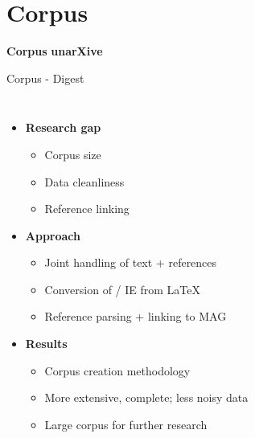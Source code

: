 \documentclass[en,16:9,smallfoot]{sdqbeamer}
\begin{document}
\section{Corpus}

   \begin{frame}[plain]
        \vspace{0.7cm}
        \begin{infobox-map}
        \centering
        \begin{Huge}
         {\textbf{Corpus}}
         {\textbf{\hphantom{C}unarXive\hphantom{C}}}
        \end{Huge}
        \end{infobox-map}
   \end{frame}

   \begin{frame}{Corpus - Digest}
   \begin{columns}
        \begin{itemize}
            \item \textbf{Research gap}
            \begin{itemize}
                \item Corpus size
                \item Data cleanliness
                \item Reference linking
            \end{itemize}
            \item \textbf{Approach}
            \begin{itemize}
                \item Joint handling of text + references
                \item Conversion of / IE from \LaTeX
                \item Reference parsing + linking to MAG
            \end{itemize}
            \item \textbf{Results}
            \begin{itemize}
                \item Corpus creation methodology
                \item More extensive, complete; less noisy data
                \item Large corpus for further research
            \end{itemize}
        \end{itemize}

\end{columns}
\end{frame}
\end{document}
